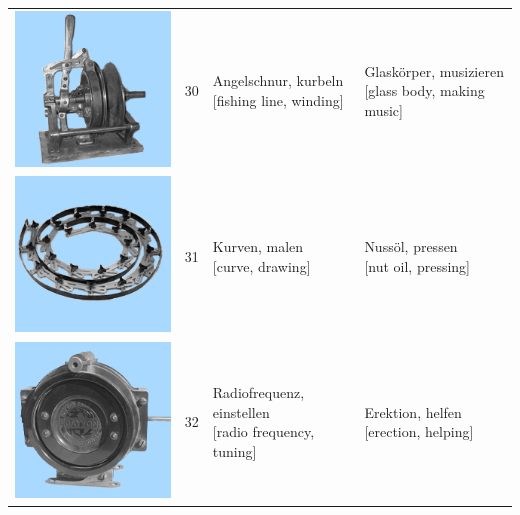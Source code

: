 \documentclass[
  english,
  man,floatsintext]{apa7}
\begin{document}
\begin{center}
\begin{ThreePartTable}
{\begin{longtable}{llll}
\includegraphics[valign=c, scale=0.23]{../materials/unfamiliar/30.png} & 30 & \makecell[l]{Angelschnur, kurbeln\\{[fishing line, winding]}} & \makecell[l]{Glaskörper, musizieren\\{[glass body, making music]}}\\
\includegraphics[valign=c, scale=0.23]{../materials/unfamiliar/31.png} & 31 & \makecell[l]{Kurven, malen\\{[curve, drawing]}} & \makecell[l]{Nussöl, pressen\\{[nut oil, pressing]}}\\
\includegraphics[valign=c, scale=0.23]{../materials/unfamiliar/32.png} & 32 & \makecell[l]{Radiofrequenz, einstellen\\{[radio frequency, tuning]}} & \makecell[l]{Erektion, helfen\\{[erection, helping]}}\\

\end{longtable}}
\end{ThreePartTable}
\end{center}
\end{document}
